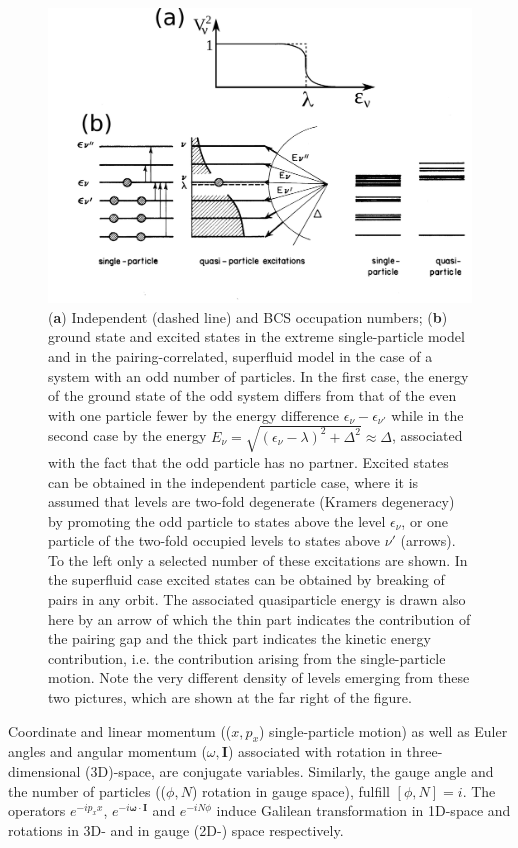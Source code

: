 \begin{figure}
	\centerline {
		\includegraphics*[width=15cm, angle=0.]{introduccion/figs/fig0_4_4_v2}
	}
	\caption{(\textbf{a}) Independent (dashed line) and BCS occupation numbers; (\textbf{b}) ground state and excited states in the extreme single-particle model and in the pairing-correlated, superfluid model in the case of a system with an odd number of particles. In the first case, the energy of the ground state of the odd system differs from that of the even with one particle fewer by the energy difference $\epsilon_\nu-\epsilon_{\nu'}$ while in the second case by the energy $E_\nu=\sqrt{(\epsilon_\nu-\lambda)^2+\Delta^2}\approx\Delta$, associated with the fact that the odd particle has no partner. Excited states can be obtained in the independent particle case, where it is assumed that levels are two-fold degenerate (Kramers degeneracy) by promoting the odd particle to states above the level $\epsilon_\nu$, or one particle of the two-fold occupied levels to  states above  $\nu'$ (arrows). To the left only a selected number of these excitations are shown. In the superfluid case excited states can be obtained by breaking of pairs in any orbit. The associated quasiparticle energy is drawn also here by an arrow of which the thin part indicates the contribution of the pairing gap and the thick part indicates the kinetic energy contribution, i.e. the contribution arising from the single-particle motion. Note the very different density of levels emerging from these two pictures, which are shown at the far right of the figure.}
	\label{fig0.4.3}
\end{figure}

Coordinate and linear momentum (($x,p_x$) single-particle motion) as well as Euler angles and angular momentum ($\omega,\mathbf I$) associated with rotation in three-dimensional (3D)-space,  are conjugate variables. Similarly, the gauge angle and the number of particles (($\phi,N$) rotation in gauge space), fulfill $[\phi,N]=i$. The operators $e^{-ip_xx}$, $e^{-i\pmb\omega\cdot\mathbf I}$ and $e^{-iN\phi}$ induce Galilean transformation in 1D-space and rotations in 3D- and in gauge (2D-) space respectively. 






